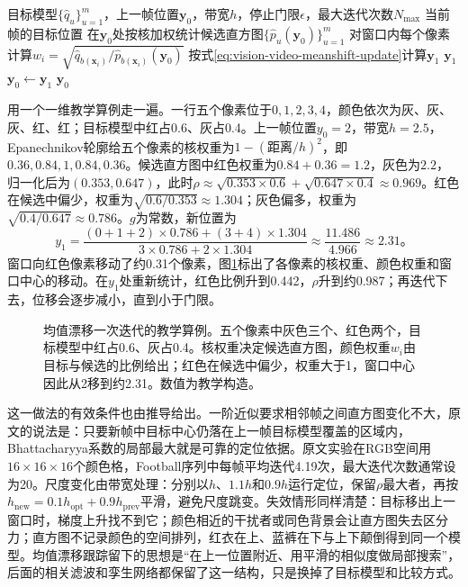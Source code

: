 \begin{algorithm}[基于核加权直方图的均值漂移定位]
  \label{alg:vision-video-meanshift}
  \begin{algorithmic}[1]
    \Require 目标模型$\{\widehat{q}_u\}_{u=1}^{m}$，上一帧位置$\bm{y}_0$，带宽$h$，停止门限$\epsilon$，最大迭代次数$N_{\max}$
    \Ensure 当前帧的目标位置
      \State 在$\bm{y}_0$处按核加权统计候选直方图$\{\widehat{p}_u(\bm{y}_0)\}_{u=1}^{m}$
      \State 对窗口内每个像素计算$w_i=\sqrt{\widehat{q}_{b(\bm{x}_i)}/\widehat{p}_{b(\bm{x}_i)}(\bm{y}_0)}$
      \State 按式\eqref{eq:vision-video-meanshift-update}计算$\bm{y}_1$
        \State \Return $\bm{y}_1$
      \EndIf
      \State $\bm{y}_0\gets\bm{y}_1$
    \EndFor
    \State \Return $\bm{y}_0$
  \end{algorithmic}
\end{algorithm}

用一个一维教学算例走一遍。一行五个像素位于$0,1,2,3,4$，颜色依次为灰、灰、灰、红、红；目标模型中红占0.6、灰占0.4。上一帧位置$y_0=2$，带宽$h=2.5$，Epanechnikov轮廓给五个像素的核权重为$1-(\text{距离}/h)^2$，即$0.36,0.84,1,0.84,0.36$。候选直方图中红色权重为$0.84+0.36=1.2$，灰色为$2.2$，归一化后为$(0.353,0.647)$，此时$\rho\approx\sqrt{0.353\times0.6}+\sqrt{0.647\times0.4}\approx0.969$。红色在候选中偏少，权重为$\sqrt{0.6/0.353}\approx1.304$；灰色偏多，权重为$\sqrt{0.4/0.647}\approx0.786$。$g$为常数，新位置为
\[
  y_1=\frac{(0+1+2)\times0.786+(3+4)\times1.304}{3\times0.786+2\times1.304}
  \approx\frac{11.486}{4.966}\approx2.31\text{。}
\]
窗口向红色像素移动了约0.31个像素，图\ref{fig:vision-meanshift-window}标出了各像素的核权重、颜色权重和窗口中心的移动。在$y_1$处重新统计，红色比例升到0.442，$\rho$升到约0.987；再迭代下去，位移会逐步减小，直到小于门限。

\begin{figure}[htbp]
  \centering
  
  \caption{均值漂移一次迭代的教学算例。五个像素中灰色三个、红色两个，目标模型中红占0.6、灰占0.4。核权重决定候选直方图，颜色权重$w_i$由目标与候选的比例给出；红色在候选中偏少，权重大于1，窗口中心因此从2移到约2.31。数值为教学构造。}
  \label{fig:vision-meanshift-window}
\end{figure}

这一做法的有效条件也由推导给出。一阶近似要求相邻帧之间直方图变化不大，原文的说法是：只要新帧中目标中心仍落在上一帧目标模型覆盖的区域内，Bhattacharyya系数的局部最大就是可靠的定位依据。原文实验在RGB空间用$16\times16\times16$个颜色格，Football序列中每帧平均迭代4.19次，最大迭代次数通常设为20。尺度变化由带宽处理：分别以$h$、$1.1h$和$0.9h$运行定位，保留$\rho$最大者，再按$h_{\mathrm{new}}=0.1h_{\mathrm{opt}}+0.9h_{\mathrm{prev}}$平滑，避免尺度跳变。失效情形同样清楚：目标移出上一窗口时，梯度上升找不到它；颜色相近的干扰者或同色背景会让直方图失去区分力；直方图不记录颜色的空间排列，红衣在上、蓝裤在下与上下颠倒得到同一个模型。均值漂移跟踪留下的思想是“在上一位置附近、用平滑的相似度做局部搜索”，后面的相关滤波和孪生网络都保留了这一结构，只是换掉了目标模型和比较方式。

